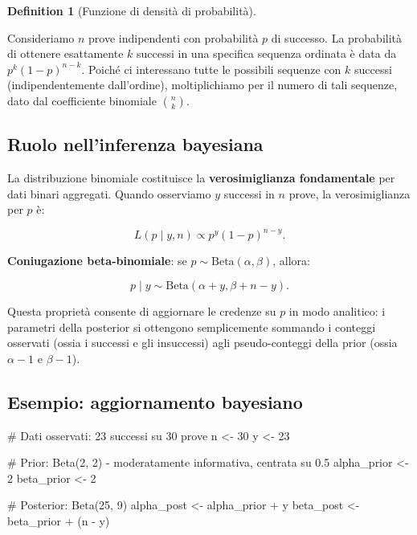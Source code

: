 \documentclass[
  letterpaper,
  DIV=11,
  numbers=noendperiod,
  oneside]{scrreprt}
\newenvironment{Shaded}{\begin{snugshade}}{\end{snugshade}}
\newcommand{\CommentTok}[1]{\textcolor[rgb]{0.37,0.37,0.37}{#1}}
\newcommand{\DecValTok}[1]{\textcolor[rgb]{0.68,0.00,0.00}{#1}}
\newcommand{\NormalTok}[1]{\textcolor[rgb]{0.00,0.23,0.31}{#1}}
\newcommand{\OtherTok}[1]{\textcolor[rgb]{0.00,0.23,0.31}{#1}}
\newcommand{\SpecialCharTok}[1]{\textcolor[rgb]{0.37,0.37,0.37}{#1}}
\theoremstyle{definition}
\theoremstyle{plain}
\theoremstyle{definition}
\newtheorem{definition}{Definition}[chapter]
\theoremstyle{remark}
\begin{document}
\begin{definition}[Funzione di densità di
probabilità]
\begin{tcolorbox}
Consideriamo \(n\) prove indipendenti con probabilità \(p\) di successo.
La probabilità di ottenere esattamente \(k\) successi in una specifica
sequenza ordinata è data da \(p^k (1-p)^{n-k}\). Poiché ci interessano
tutte le possibili sequenze con \(k\) successi (indipendentemente
dall'ordine), moltiplichiamo per il numero di tali sequenze, dato dal
coefficiente binomiale \(\binom{n}{k}\).

\end{tcolorbox}

\subsection{Ruolo nell'inferenza
bayesiana}\label{ruolo-nellinferenza-bayesiana-2}

La distribuzione binomiale costituisce la \textbf{verosimiglianza
fondamentale} per dati binari aggregati. Quando osserviamo \(y\)
successi in \(n\) prove, la verosimiglianza per \(p\) è:

\[
L(p \mid y, n) \propto p^y (1-p)^{n-y}.
\]

\textbf{Coniugazione beta-binomiale}: se
\(p \sim \text{Beta}(\alpha, \beta)\), allora:

\[
p \mid y \sim \text{Beta}(\alpha + y, \beta + n - y).
\]

Questa proprietà consente di aggiornare le credenze su \(p\) in modo
analitico: i parametri della posterior si ottengono semplicemente
sommando i conteggi osservati (ossia i successi e gli insuccessi) agli
pseudo-conteggi della prior (ossia \(\alpha - 1\) e \(\beta - 1\)).

\subsection{Esempio: aggiornamento
bayesiano}\label{esempio-aggiornamento-bayesiano}

\begin{Shaded}
\begin{Highlighting}[]
\CommentTok{\# Dati osservati: 23 successi su 30 prove}
\NormalTok{n }\OtherTok{\textless{}{-}} \DecValTok{30}
\NormalTok{y }\OtherTok{\textless{}{-}} \DecValTok{23}

\CommentTok{\# Prior: Beta(2, 2) {-} moderatamente informativa, centrata su 0.5}
\NormalTok{alpha\_prior }\OtherTok{\textless{}{-}} \DecValTok{2}
\NormalTok{beta\_prior }\OtherTok{\textless{}{-}} \DecValTok{2}

\CommentTok{\# Posterior: Beta(25, 9)}
\NormalTok{alpha\_post }\OtherTok{\textless{}{-}}\NormalTok{ alpha\_prior }\SpecialCharTok{+}\NormalTok{ y}
\NormalTok{beta\_post }\OtherTok{\textless{}{-}}\NormalTok{ beta\_prior }\SpecialCharTok{+}\NormalTok{ (n }\SpecialCharTok{{-}}\NormalTok{ y)}


\end{Highlighting}
\end{Shaded}
\end{definition}
\end{document}
